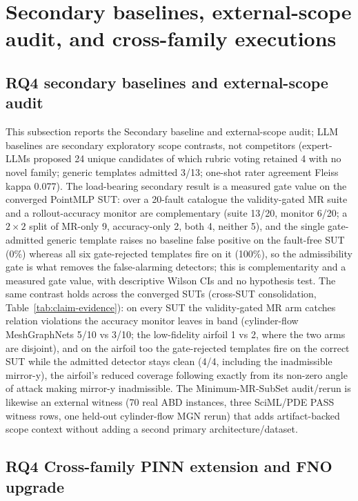 \documentclass[preprint,12pt]{elsarticle}
\begin{document}
\section{Secondary baselines, external-scope audit, and cross-family executions}
\label{app:secondary}

\subsection{RQ4 secondary baselines and external-scope audit}
\label{subsec:llm-mr-baseline}

This subsection reports the Secondary baseline and external-scope audit; LLM baselines are secondary exploratory scope contrasts, not competitors (expert-LLMs proposed 24 unique candidates of which rubric voting retained 4 with no novel family; generic templates admitted 3/13; one-shot rater agreement Fleiss kappa 0.077). The load-bearing secondary result is a measured gate value on the converged PointMLP SUT: over a 20-fault catalogue the validity-gated MR suite and a rollout-accuracy monitor are complementary (suite 13/20, monitor 6/20; a $2\times2$ split of MR-only 9, accuracy-only 2, both 4, neither 5), and the single gate-admitted generic template raises no baseline false positive on the fault-free SUT (0\%) whereas all six gate-rejected templates fire on it (100\%), so the admissibility gate is what removes the false-alarming detectors; this is complementarity and a measured gate value, with descriptive Wilson CIs and no hypothesis test. The same contrast holds across the converged SUTs (cross-SUT consolidation, Table~\ref{tab:claim-evidence}): on every SUT the validity-gated MR arm catches relation violations the accuracy monitor leaves in band (cylinder-flow MeshGraphNets 5/10 vs 3/10; the low-fidelity airfoil 1 vs 2, where the two arms are disjoint), and on the airfoil too the gate-rejected templates fire on the correct SUT while the admitted detector stays clean (4/4, including the inadmissible mirror-y), the airfoil's reduced coverage following exactly from its non-zero angle of attack making mirror-y inadmissible. The Minimum-MR-SubSet audit/rerun is likewise an external witness (70 real ABD instances, three SciML/PDE PASS witness rows, one held-out cylinder-flow MGN rerun) that adds artifact-backed scope context without adding a second primary architecture/dataset.

\subsection{RQ4 Cross-family PINN extension and FNO upgrade}
\label{subsec:pinn-extension}
\end{document}
